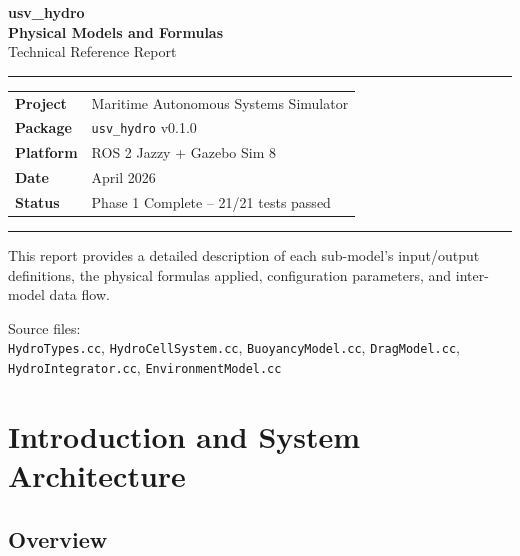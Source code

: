 \documentclass[12pt,a4paper]{article}
\begin{document}
\begin{titlepage}
  \centering
  \vspace*{2cm}
  {\Huge\bfseries usv\_hydro}\\[0.4em]
  {\Large\bfseries Physical Models and Formulas}\\[0.3em]
  {\large Technical Reference Report}
  \vspace{1.5cm}

  \rule{0.85\linewidth}{1pt}
  \vspace{0.5cm}

  \begin{tabular}{ll}
    \textbf{Project}  & Maritime Autonomous Systems Simulator \\
    \textbf{Package}  & \texttt{usv\_hydro} v0.1.0 \\
    \textbf{Platform} & ROS 2 Jazzy + Gazebo Sim 8 \\
    \textbf{Date}     & April 2026 \\
    \textbf{Status}   & Phase 1 Complete -- 21/21 tests passed \\
  \end{tabular}

  \vspace{1.5cm}\rule{0.85\linewidth}{0.4pt}\vspace{0.8cm}

  {\small This report provides a detailed description of each sub-model's
  input/output definitions, the physical formulas applied, configuration
  parameters, and inter-model data flow.}

  \vfill
  {\footnotesize Source files:\\
  \texttt{HydroTypes.cc}, \texttt{HydroCellSystem.cc},
  \texttt{BuoyancyModel.cc}, \texttt{DragModel.cc},
  \texttt{HydroIntegrator.cc}, \texttt{EnvironmentModel.cc}}
\end{titlepage}

\tableofcontents
\newpage

\section{Introduction and System Architecture}

\subsection{Overview}
\end{document}

